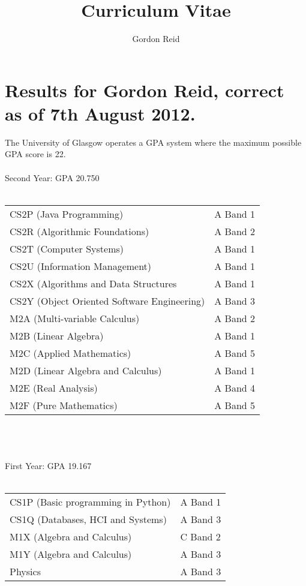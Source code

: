 \documentclass[10pt,a4paper]{article}
\title{Curriculum Vitae}
\author{Gordon Reid}
\begin{document}
\section*{Results for Gordon Reid, correct as of 7th August 2012.}
The University of Glasgow operates a GPA system where the maximum possible GPA score is 22.\\\\
Second Year: GPA 20.750\\\\
\begin{tabular}{ll}
	CS2P (Java Programming) & A Band 1\\
	CS2R (Algorithmic Foundations) & A Band 2\\
	CS2T (Computer Systems) & A Band 1\\
	CS2U (Information Management) & A Band 1\\
	CS2X (Algorithms and Data Structures & A Band 1\\
	CS2Y (Object Oriented Software Engineering) & A Band 3\\
	M2A (Multi-variable Calculus) & A Band 2\\
	M2B (Linear Algebra) & A Band 1\\
	M2C (Applied Mathematics) & A Band 5\\
	M2D (Linear Algebra and Calculus) & A Band 1\\
	M2E (Real Analysis) & A Band 4\\
	M2F (Pure Mathematics) & A Band 5\\
\end{tabular}
\\\\\\
First Year: GPA 19.167\\\\
\begin{tabular}{ll}
	CS1P (Basic programming in Python) & A Band 1\\
	CS1Q (Databases, HCI and Systems) & A Band 3\\
	M1X (Algebra and Calculus) & C Band 2\\
	M1Y (Algebra and Calculus) & A Band 3\\
	Physics & A Band 3\\
\end{tabular}
\end{document}
